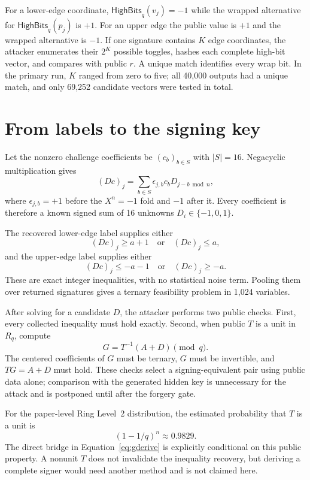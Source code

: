 \documentclass[10pt,a4paper]{article}
\newcommand{\Rq}{R_q}
\newcommand{\HB}{\mathsf{HighBits}_q}
\begin{document}
For a lower-edge coordinate, $\HB(v_j)=-1$ while the wrapped alternative for
$\HB(p_j)$ is $+1$. For an upper edge the public value is $+1$ and the wrapped
alternative is $-1$. If one signature contains $K$ edge coordinates, the
attacker enumerates their $2^K$ possible toggles, hashes each complete
high-bit vector, and compares with public $r$. A unique match identifies every
wrap bit. In the primary run, $K$ ranged from zero to five; all 40,000 outputs
had a unique match, and only 69,252 candidate vectors were tested in total.

\section{From labels to the signing key}

Let the nonzero challenge coefficients be $(c_b)_{b\in S}$ with
$|S|=16$. Negacyclic multiplication gives
\[
  (Dc)_j=\sum_{b\in S}\epsilon_{j,b}c_bD_{j-b\bmod n},
\]
where $\epsilon_{j,b}=+1$ before the $X^n=-1$ fold and $-1$ after it. Every
coefficient is therefore a known signed sum of 16 unknowns
$D_i\in\{-1,0,1\}$.

The recovered lower-edge label supplies either
\[
  (Dc)_j\geq a+1 \quad\text{or}\quad (Dc)_j\leq a,
\]
and the upper-edge label supplies either
\[
  (Dc)_j\leq-a-1 \quad\text{or}\quad (Dc)_j\geq-a.
\]
These are exact integer inequalities, with no statistical noise term. Pooling
them over returned signatures gives a ternary feasibility problem in 1,024
variables.

After solving for a candidate $D$, the attacker performs two public checks.
First, every collected inequality must hold exactly. Second, when public $T$
is a unit in $\Rq$, compute
\begin{equation}
  G=T^{-1}(A+D)\pmod q.              \label{eq:gderive}
\end{equation}
The centered coefficients of $G$ must be ternary, $G$ must be invertible, and
$TG=A+D$ must hold. These checks select a signing-equivalent pair using public
data alone; comparison with the generated hidden key is unnecessary for the
attack and is postponed until after the forgery gate.

For the paper-level Ring Level~2 distribution, the estimated probability that
$T$ is a unit is
\[
  (1-1/q)^n\approx0.9829.
\]
The direct bridge in Equation~\eqref{eq:gderive} is explicitly conditional on
this public property. A nonunit $T$ does not invalidate the inequality
recovery, but deriving a complete signer would need another method and is not
claimed here.
\end{document}
